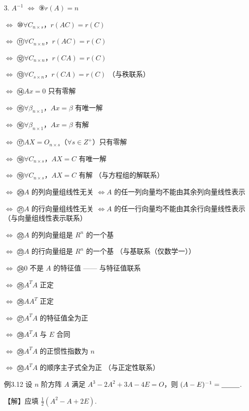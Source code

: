 \begin{fcard}{3. $A^{-1}$}
$\Leftrightarrow$ ⑨$r(A)=n$

$\Leftrightarrow$ ⑩$\forall C_{n\times s}$，$r(AC)=r(C)$

$\Leftrightarrow$ ⑪$\forall C_{n\times n}$，$r(AC)=r(C)$

$\Leftrightarrow$ ⑫$\forall C_{n\times n}$，$r(CA)=r(C)$

$\Leftrightarrow$ ⑬$\forall C_{s\times n}$，$r(CA)=r(C)$ \quad（与秩联系）

$\Leftrightarrow$ ⑭$Ax=0$ 只有零解

$\Leftrightarrow$ ⑮$\forall\beta_{n\times1}$，$Ax=\beta$ 有唯一解

$\Leftrightarrow$ ⑯$\forall\beta_{n\times1}$，$Ax=\beta$ 有解

$\Leftrightarrow$ ⑰$AX=O_{n\times s}$（$\forall s\in Z^{+}$）只有零解

$\Leftrightarrow$ ⑱$\forall C_{n\times s}$，$AX=C$ 有唯一解

$\Leftrightarrow$ ⑲$\forall C_{n\times s}$，$AX=C$ 有解 \quad（与方程组的解联系）

$\Leftrightarrow$ ⑳$A$ 的列向量组线性无关 $\Leftrightarrow A$ 的任一列向量均不能由其余列向量线性表示

$\Leftrightarrow$ ㉑$A$ 的行向量组线性无关 $\Leftrightarrow A$ 的任一行向量均不能由其余行向量线性表示 \quad（与向量组线性表示联系）

$\Leftrightarrow$ ㉒$A$ 的列向量组是 $R^{n}$ 的一个基

$\Leftrightarrow$ ㉓$A$ 的行向量组是 $R^{n}$ 的一个基 \quad（与基联系（仅数学一））

$\Leftrightarrow$ ㉔$0$ 不是 $A$ 的特征值 —— 与特征值联系

$\Leftrightarrow$ ㉕$A^{T}A$ 正定

$\Leftrightarrow$ ㉖$AA^{T}$ 正定

$\Leftrightarrow$ ㉗$A^{T}A$ 的特征值全为正

$\Leftrightarrow$ ㉘$A^{T}A$ 与 $E$ 合同

$\Leftrightarrow$ ㉙$A^{T}A$ 的正惯性指数为 $n$

$\Leftrightarrow$ ㉚$A^{T}A$ 的顺序主子式全为正 \quad（与正定性联系）
\end{fcard}

\begin{fcard}{例3.12}
设 $n$ 阶方阵 $A$ 满足 $A^{3}-2A^{2}+3A-4E=O$，则 $(A-E)^{-1}=\underline{\hspace{2.6em}}$.
\end{fcard}

【解】应填 $\frac{1}{2}(A^{2}-A+2E)$.

